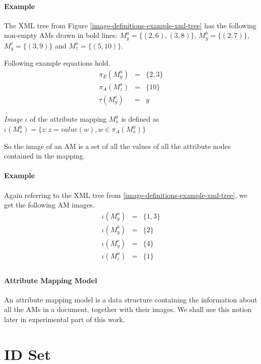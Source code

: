 \paragraph{Example}
The XML tree from Figure \ref{image-definitions-example-xml-tree} has the following non-empty AMs drawn in bold lines: $M_{y}^{a} = \{(2,6), (3,8)\}$, $M_{y}^{b} = \{(2,7)\}$, $M_{y}^{c} = \{(3,9)\}$ and $M_{z}^{a} = \{(5,10)\}$.

Following example equations hold.
\begin{eqnarray*}
\pi_E(M_{y}^{a}) & = & \{2, 3\} \\
\pi_A(M_{z}^{a}) & = & \{10\} \\
\tau(M_{y}^{c}) & = & y
\end{eqnarray*}

\begin{define}
	\textit{Image} $\iota$ of the attribute mapping $M_{x}^{y}$ is defined as $\iota(M_{x}^{y}) = \{z: z = value(w), w \in \pi_A(M_{x}^{y})\}$
\end{define}

So the image of an AM is a set of all the values of all the attribute nodes contained in the mapping.

\paragraph{Example}
Again referring to the XML tree from \ref{image-definitions-example-xml-tree}, we get the following AM images.
\begin{eqnarray*}
\iota(M_{y}^{a}) & = & \{1, 3\} \\
\iota(M_{y}^{b}) & = & \{2\} \\
\iota(M_{y}^{c}) & = & \{4\} \\
\iota(M_{z}^{a}) & = & \{1\} \\
\end{eqnarray*}

\paragraph{Attribute Mapping Model}
An attribute mapping model is a data structure containing the information about all the AMs in a document, together with their images. We shall use this notion later in experimental part of this work.

\section{ID Set}
\label{section-definitions-id-set}

